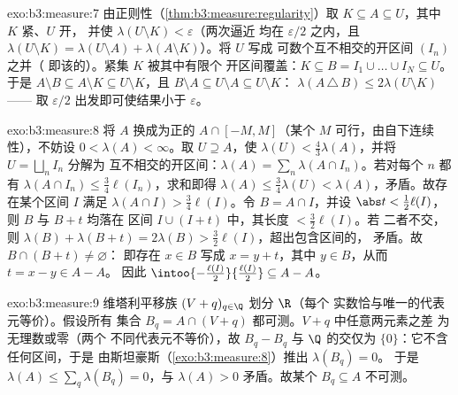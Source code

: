 \begin{solution}{exo:b3:measure:7}
由正则性（\cref{thm:b3:measure:regularity}）取 $K
\subseteq A \subseteq U$，其中 $K$ 紧、$U$ 开，
并使 $\lambda(U\setminus K) < \varepsilon$（两次逼近
均在 $\varepsilon/2$ 之内，且 $\lambda(U \setminus K) =
\lambda(U\setminus A) + \lambda(A \setminus K)$）。将 $U$ 写成
可数个互不相交的开区间 $(I_n)$ 之并（
即该的）。紧集 $K$ 被其中有限个
开区间覆盖：$K \subseteq B = I_1\cup\dots\cup I_N \subseteq
U$。于是 $A \setminus B \subseteq A\setminus K \subseteq
U\setminus K$，且 $B \setminus A \subseteq U \setminus A
\subseteq U\setminus K$：
$\lambda(A\,\triangle\,B) \leq 2\lambda(U\setminus K)$——
取 $\varepsilon/2$ 出发即可使结果小于 $\varepsilon$。
\end{solution}

\begin{solution}{exo:b3:measure:8}
将 $A$ 换成为正的 $A \cap [-M, M]$（某个 $M$
可行，由自下连续性），不妨设 $0 < \lambda(A) <
\infty$。取 $U \supseteq A$，使 $\lambda(U) <
\frac43\lambda(A)$，并将 $U = \bigsqcup_nI_n$ 分解为
互不相交的开区间：$\lambda(A) = \sum_n\lambda(A\cap
I_n)$。若对每个 $n$ 都有 $\lambda(A\cap I_n) \leq
\frac34\ell(I_n)$，求和即得 $\lambda(A) \leq
\frac34\lambda(U) < \lambda(A)$，矛盾。故存在某个区间 $I$ 满足
$\lambda(A\cap I) > \frac34\ell(I)$。令 $B = A \cap I$，并设
$\abs t < \frac12\ell(I)$，则 $B$ 与 $B + t$ 均落在
区间 $I \cup (I + t)$ 中，其长度 $< \frac32\ell(I)$。若
二者不交，则 $\lambda(B) + \lambda(B + t) = 2\lambda(B)
> \frac32\ell(I)$，超出包含区间的，
矛盾。故 $B \cap (B + t) \neq \varnothing$：
即存在 $x \in B$ 写成 $x = y + t$，其中 $y \in B$，从而 $t = x -
y \in A - A$。
因此 $\intoo{-\frac{\ell(I)}2}{\frac{\ell(I)}2} \subseteq A -
A$。
\end{solution}

\begin{solution}{exo:b3:measure:9}
维塔利平移族 $(V + q)_{q\in\Q}$ 划分 $\R$（每个
实数恰与唯一的代表元等价）。假设所有
集合 $B_q = A \cap (V + q)$ 都可测。$V + q$ 中任意两元素之差
为无理数或零（两个
不同代表元不等价），故 $B_q - B_q$
与 $\Q$ 的交仅为 $\{0\}$：它不含任何区间，于是
由斯坦豪斯（\cref{exo:b3:measure:8}）推出 $\lambda(B_q) = 0$。
于是 $\lambda(A) \leq \sum_{q}\lambda(B_q) = 0$，与
$\lambda(A) > 0$ 矛盾。故某个 $B_q \subseteq A$ 不可测。
\end{solution}

